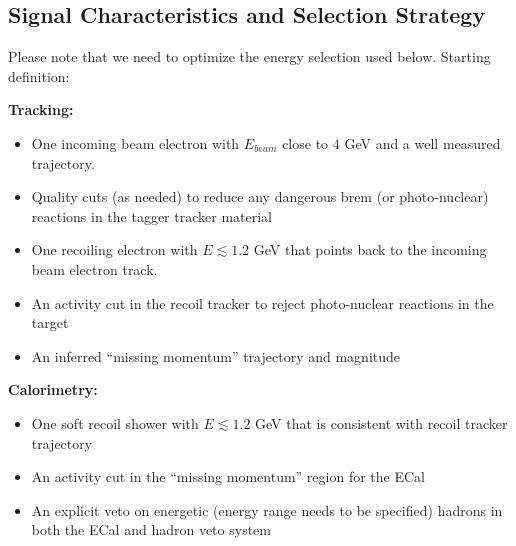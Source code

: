 
\subsection{Signal Characteristics and Selection Strategy}







Please note that we need to optimize the energy selection used below. Starting
definition: 

\textbf{Tracking:} 
\begin{itemize}
    \item One incoming beam electron with $E_{beam}$ close to $4$ GeV and a well
          measured trajectory. 
    \item Quality cuts (as needed) to reduce any dangerous brem 
          (or photo-nuclear) reactions in the tagger tracker material
    \item One recoiling electron with $E\lesssim 1.2$ GeV that points back to 
          the incoming beam electron track. 
    \item An activity cut in the recoil tracker to reject photo-nuclear 
          reactions in the target
    \item An inferred ``missing momentum'' trajectory and magnitude 
\end{itemize}

\textbf{Calorimetry:}
\begin{itemize}
    \item One soft recoil shower with $E\lesssim 1.2$ GeV that is consistent 
          with recoil tracker trajectory
    \item An activity cut in the ``missing momentum'' region for the ECal
    \item An explicit veto on energetic (energy range needs to be specified)
          hadrons in both the ECal and hadron veto system 
\end{itemize}

